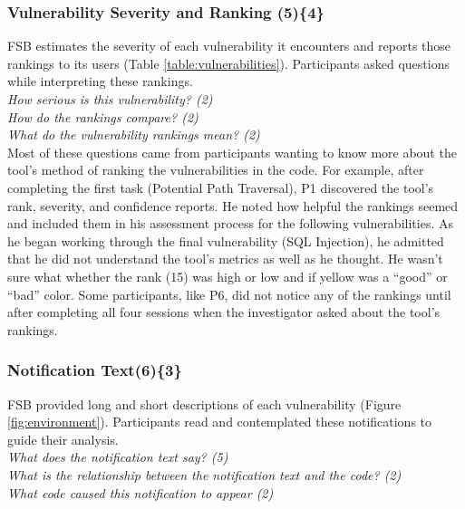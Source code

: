 \documentclass{sig-alternate}
\begin{document}

\subsubsection{\textbf{Vulnerability Severity and Ranking (5)\{4\}}}\label{bsr}

FSB estimates the severity of each vulnerability it encounters and reports those rankings to its users (Table \ref{table:vulnerabilities}). 
Participants asked questions while interpreting these rankings.
\\

\noindent\emph{How serious is this vulnerability? (2)} \\
\emph{How do the rankings compare? (2)} \\
\emph{What do the vulnerability rankings mean? (2)}
\\
 
Most of these questions came from participants wanting to know more about the tool's method of ranking the vulnerabilities in the code.
For example, after completing the first task (Potential Path Traversal), P1 discovered the tool's rank, severity, and confidence reports. 
He noted how helpful the rankings seemed and included them in his assessment process for the following vulnerabilities.
As he began working through the final vulnerability (SQL Injection), he admitted that he did not understand the tool's metrics as well as he thought. 
He wasn't sure what whether the rank (15) was high or low and if yellow was a ``good'' or ``bad'' color.
Some participants, like P6, did not notice any of the rankings until after completing all four sessions when the investigator asked about the tool's rankings.


\subsubsection{\textbf{Notification Text(6)\{3\}}}\label{em}

FSB provided long and short descriptions of each vulnerability (Figure \ref{fig:environment}). 
Participants read and contemplated these notifications to guide their analysis.
\\

\noindent\emph{What does the notification text say? (5)} \\
\emph{What is the relationship between the notification text and the code? (2)} \\
\emph{What code caused this notification to appear (2)} 
\\
\end{document}
